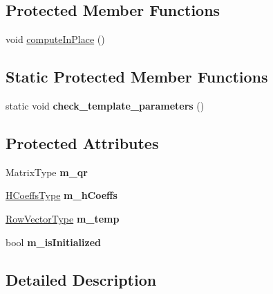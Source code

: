 \subsection*{Protected Member Functions}
\begin{DoxyCompactItemize}
\item 
void \mbox{\hyperlink{class_eigen_1_1_householder_q_r_a3a16530338a734971fc45efb0ef9ac94}{compute\+In\+Place}} ()
\end{DoxyCompactItemize}
\subsection*{Static Protected Member Functions}
\begin{DoxyCompactItemize}
\item 
\mbox{\label{class_eigen_1_1_householder_q_r_ab9ae903a54d86452afaf77531396fc27}} 
static void {\bfseries check\+\_\+template\+\_\+parameters} ()
\end{DoxyCompactItemize}
\subsection*{Protected Attributes}
\begin{DoxyCompactItemize}
\item 
\mbox{\label{class_eigen_1_1_householder_q_r_adb06ba1b2259a00b25b5f0e1d86e22ae}} 
Matrix\+Type {\bfseries m\+\_\+qr}
\item 
\mbox{\label{class_eigen_1_1_householder_q_r_ad5cba8a1c0ad16e52bc8aeda2710013f}} 
\mbox{\hyperlink{struct_eigen_1_1internal_1_1true__type}{H\+Coeffs\+Type}} {\bfseries m\+\_\+h\+Coeffs}
\item 
\mbox{\label{class_eigen_1_1_householder_q_r_a640f06115b8b7ecebac29ca785ff2527}} 
\mbox{\hyperlink{struct_eigen_1_1internal_1_1true__type}{Row\+Vector\+Type}} {\bfseries m\+\_\+temp}
\item 
\mbox{\label{class_eigen_1_1_householder_q_r_aa616849e6a79978091208f4d15046205}} 
bool {\bfseries m\+\_\+is\+Initialized}
\end{DoxyCompactItemize}


\subsection{Detailed Description}
